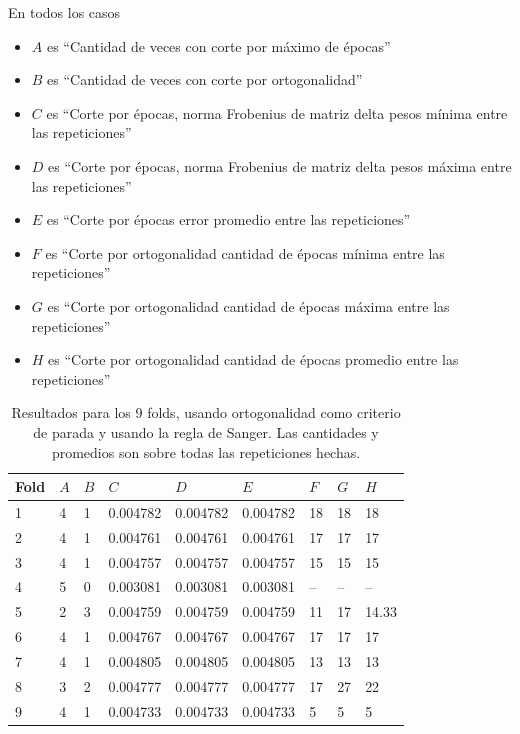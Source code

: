 \documentclass[informe.tex]{subfiles}
\begin{document}
	En todos los casos 
	\begin{itemize}
	\item $A$ es ``Cantidad de veces con corte por máximo de épocas''
	\item $B$ es ``Cantidad de veces con corte por ortogonalidad''
	\item $C$ es ``Corte por épocas, norma Frobenius de matriz delta pesos mínima entre las repeticiones''
	\item $D$ es ``Corte por épocas, norma Frobenius de matriz delta pesos máxima entre las repeticiones''
	\item $E$ es ``Corte por épocas error promedio entre las repeticiones''
	\item $F$ es ``Corte por ortogonalidad cantidad de épocas mínima entre las repeticiones''
	\item $G$ es ``Corte por ortogonalidad cantidad de épocas máxima entre las repeticiones''
	\item $H$ es ``Corte por ortogonalidad cantidad de épocas promedio entre las repeticiones''
	\end{itemize}
  
	
	\begin{table}[H]
	  \centering
	  \begin{tabular}{|l|l|l|l|l|l|l|l|l|} \hline
	  Fold & $A$ & $B$ & $C$ & $D$ & $E$ & $F$ & $G$ & $H$ \\ \hline
	  1& 4 & 1 & 0.004782 & 0.004782 & 0.004782 & 18 & 18 & 18 \\ \hline
	  2& 4 & 1 & 0.004761 & 0.004761 & 0.004761 & 17 & 17 & 17 \\ \hline
	  3& 4 & 1 & 0.004757 & 0.004757 & 0.004757 & 15 & 15 & 15 \\ \hline
	  4& 5 & 0 & 0.003081 & 0.003081 & 0.003081 & -- & -- & -- \\ \hline
	  5& 2 & 3 & 0.004759 & 0.004759 & 0.004759 & 11 & 17 & 14.33 \\ \hline
	  6& 4 & 1 & 0.004767 & 0.004767 & 0.004767 & 17 & 17 & 17 \\ \hline
	  7& 4 & 1 & 0.004805 & 0.004805 & 0.004805 & 13 & 13 & 13 \\ \hline
	  8& 3 & 2 & 0.004777 & 0.004777 & 0.004777 & 17 & 27 & 22 \\ \hline
	  9& 4 & 1 & 0.004733 & 0.004733 & 0.004733 & 5 & 5 & 5 \\ \hline
	  \end{tabular}
	  \caption{Resultados para los 9 folds, usando ortogonalidad como criterio de parada y usando la regla de Sanger. Las cantidades y promedios son sobre todas las repeticiones hechas.}
	  \label{tab:ortogonalidad_sanger500}
	\end{table}
\end{document}

